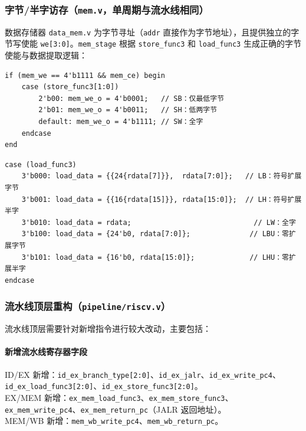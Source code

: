 \documentclass[12pt,hyperref,a4paper,UTF8]{ctexart}
\begin{document}
\subsubsection{字节/半字访存（\texttt{mem.v}，单周期与流水线相同）}

数据存储器 \texttt{data\_mem.v} 为字节寻址（\texttt{addr} 直接作为字节地址），且提供独立的字节写使能 \texttt{we[3:0]}。\texttt{mem\_stage} 根据 \texttt{store\_func3} 和 \texttt{load\_func3} 生成正确的字节使能与数据提取逻辑：

\begin{lstlisting}[caption={字节写使能生成（STORE）}]
if (mem_we == 4'b1111 && mem_ce) begin
    case (store_func3[1:0])
        2'b00: mem_we_o = 4'b0001;   // SB：仅最低字节
        2'b01: mem_we_o = 4'b0011;   // SH：低两字节
        default: mem_we_o = 4'b1111; // SW：全字
    endcase
end
\end{lstlisting}

\begin{lstlisting}[caption={加载数据提取（LOAD）}]
case (load_func3)
    3'b000: load_data = {{24{rdata[7]}},  rdata[7:0]};   // LB：符号扩展字节
    3'b001: load_data = {{16{rdata[15]}}, rdata[15:0]};  // LH：符号扩展半字
    3'b010: load_data = rdata;                             // LW：全字
    3'b100: load_data = {24'b0, rdata[7:0]};              // LBU：零扩展字节
    3'b101: load_data = {16'b0, rdata[15:0]};             // LHU：零扩展半字
endcase
\end{lstlisting}

\subsubsection{流水线顶层重构（\texttt{pipeline/riscv.v}）}

流水线顶层需要针对新增指令进行较大改动，主要包括：

\paragraph{新增流水线寄存器字段}

ID/EX 新增：\texttt{id\_ex\_branch\_type[2:0]}、\texttt{id\_ex\_jalr}、\texttt{id\_ex\_write\_pc4}、\\
\texttt{id\_ex\_load\_func3[2:0]}、\texttt{id\_ex\_store\_func3[2:0]}。\\
EX/MEM 新增：\texttt{ex\_mem\_load\_func3}、\texttt{ex\_mem\_store\_func3}、\texttt{ex\_mem\_write\_pc4}、\texttt{ex\_mem\_return\_pc}（JALR 返回地址）。\\
MEM/WB 新增：\texttt{mem\_wb\_write\_pc4}、\texttt{mem\_wb\_return\_pc}。
\end{document}
